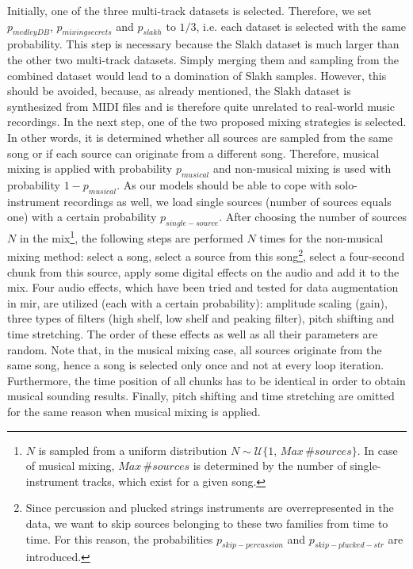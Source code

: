 Initially, one of the three multi-track datasets is selected. Therefore, we set $p_{medleyDB}$, $p_{mixingsecrets}$ and $p_{slakh}$ to $1/3$, i.e. each dataset is selected with the same probability. This step is necessary because the Slakh dataset is much larger than the other two multi-track datasets. Simply merging them and sampling from the combined dataset would lead to a domination of Slakh samples. However, this should be avoided, because, as already mentioned, the Slakh dataset is synthesized from MIDI files and is therefore quite unrelated to real-world music recordings. In the next step, one of the two proposed mixing strategies is selected. In other words, it is determined whether all sources are sampled from the same song or if each source can originate from a different song. Therefore, musical mixing is applied with probability $p_{musical}$ and non-musical mixing is used with probability $1 - p_{musical}$. As our models should be able to cope with solo-instrument recordings as well, we load single sources (number of sources equals one) with a certain probability $p_{single-source}$. After choosing the number of sources $N$ in the mix\footnote{$N$ is sampled from a uniform distribution $N \sim \mathcal{U}\{1, \, Max \, \#sources\}$. In case of musical mixing, $Max \, \#sources$ is determined by the number of single-instrument tracks, which exist for a given song.}, the following steps are performed $N$ times for the non-musical mixing method: select a song, select a source from this song\footnote{Since percussion and plucked strings instruments are overrepresented in the data, we want to skip sources belonging to these two families from time to time. For this reason, the probabilities $p_{skip-percussion}$ and $p_{skip-plucked-str}$ are introduced.}, select a four-second chunk from this source, apply some digital effects on the audio and add it to the mix. Four audio effects, which have been tried and tested for data augmentation in \gls{mir}, are utilized (each with a certain probability): amplitude scaling (gain), three types of filters (high shelf, low shelf and peaking filter), pitch shifting and time stretching. The order of these effects as well as all their parameters are random. Note that, in the musical mixing case, all sources originate from the same song, hence a song is selected only once and not at every loop iteration. Furthermore, the time position of all chunks has to be identical in order to obtain musical sounding results. Finally, pitch shifting and time stretching are omitted for the same reason when musical mixing is applied.


